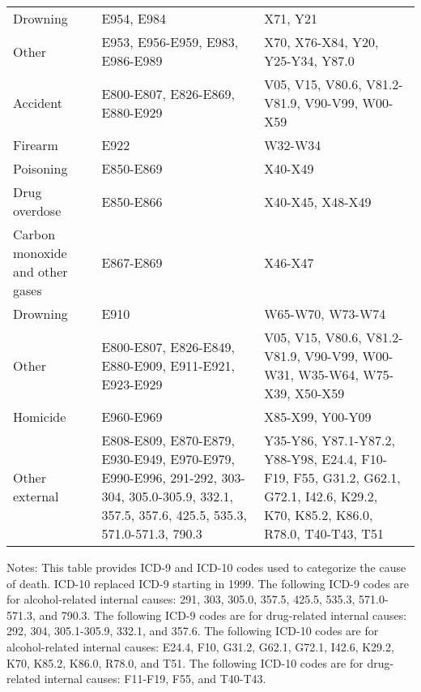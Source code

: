 \documentclass[letterpaper,12pt]{article}
\newcommand\Tstrut{\rule{0pt}{2.6ex}}         %
\begin{document}
\begin{longtable}{P{.25\linewidth} P{.3\linewidth} P{.3\linewidth}}
\hspace{.6cm} Drowning & 
E954, E984 &
X71, Y21 \Tstrut\\

\hspace{.6cm} Other & 
E953, E956-E959, E983, E986-E989 &
X70, X76-X84, Y20, Y25-Y34, Y87.0 \Tstrut\\

\hspace{.2cm} Accident & 
E800-E807, E826-E869, E880-E929 &
V05, V15, V80.6, V81.2-V81.9, V90-V99, W00-X59 \Tstrut\\

\hspace{.6cm} Firearm & 
E922 &
W32-W34 \Tstrut\\

\hspace{.6cm} Poisoning & 
E850-E869 &
X40-X49 \Tstrut\\

\hspace{.9cm} Drug overdose & 
E850-E866 &
X40-X45, X48-X49 \Tstrut\\

\hangindent=1cm
\hspace{.9cm} Carbon monoxide and other gases & 
E867-E869 &
X46-X47 \Tstrut\\

\hspace{.6cm} Drowning & 
E910 &
W65-W70, W73-W74 \Tstrut\\

\hspace{.6cm} Other & 
E800-E807, E826-E849, E880-E909, E911-E921, E923-E929 &
V05, V15, V80.6, V81.2-V81.9, V90-V99, W00-W31, W35-W64, W75-X39, X50-X59 \Tstrut\\

\hspace{.2cm} Homicide & 
E960-E969 &
X85-X99, Y00-Y09 \Tstrut\\

\hspace{.2cm} Other external & 
E808-E809, E870-E879, E930-E949, E970-E979, E990-E996, 291-292, 303-304, 305.0-305.9, 332.1, 357.5, 357.6, 425.5, 535.3, 571.0-571.3, 790.3 &
Y35-Y86, Y87.1-Y87.2, Y88-Y98, E24.4, F10-F19, F55, G31.2, G62.1, G72.1, I42.6, K29.2, K70, K85.2, K86.0, R78.0, T40-T43, T51 \Tstrut\\


\end{longtable}
\begin{flushleft}
\scriptsize Notes: This table provides ICD-9 and ICD-10 codes used to categorize the cause of death. ICD-10 replaced ICD-9 starting in 1999. The following ICD-9 codes are for alcohol-related internal causes: 291, 303, 305.0, 357.5, 425.5, 535.3, 571.0-571.3, and 790.3. The following ICD-9 codes are for drug-related internal causes: 292, 304, 305.1-305.9, 332.1, and 357.6. The following ICD-10 codes are for alcohol-related internal causes: E24.4, F10, G31.2, G62.1, G72.1, I42.6, K29.2, K70, K85.2, K86.0, R78.0, and T51. The following ICD-10 codes are for drug-related internal causes: F11-F19, F55, and T40-T43.
\end{flushleft}

\end{document}
